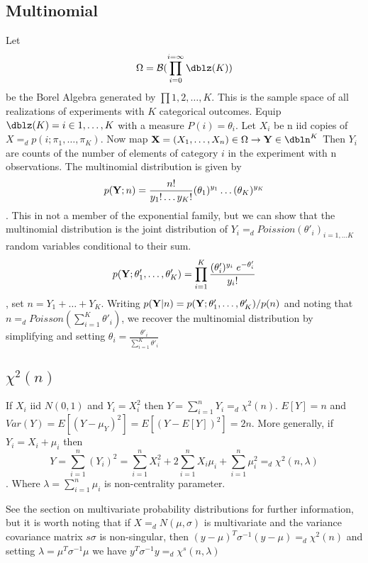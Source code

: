 \subsection{Multinomial}%
Let \[\Omega=\mathcal{B}(\prod\limits_{i=0}^{i=\infty}
\dblz(K))\] be the Borel Algebra generated by $\prod {1, 2,
\hdots , K}$. This is the sample space of all realizations of
experiments with $K$ categorical outcomes. Equip $\dblz(K)= {i
\in {1, \hdots, K}}$ with a measure $P(i)=\theta_i$. Let
${X_i}$ be n iid copies of $X =_d p(i ; \pi_1, \hdots ,
\pi_K)$.  Now map $\mbf{X}=(X_1, \hdots, X_n) \in \Omega
\rightarrow \mbf{Y} \in \dbln^K$  Then $Y_i$ are counts of the
number of elements of category $i$ in the experiment with n
observations.  The multinomial distribution is given by
\[p(\mathbf{Y};n)=\frac{n!}{y_1! \hdots y_K!} (\theta_1)^{y_1} \hdots
(\theta_K)^{y_K} \].  This in not a member of the exponential
family, but we can show that the multinomial distribution is
the joint distribution of ${Y_i =_d Poission(\theta'_i)}_{i=1,
\hdots K}$ random variables conditional to their sum.
\[p(\mathbf{Y}; \theta'_1, \hdots , \theta'_K) =
\prod\limits_{i=1}^{K} \frac{ (\theta'_i)^{y_i} \;
e^{-\theta'_i}}{y_i!}\], set $n=Y_1 + \hdots + Y_K$. Writing
$p(\mathbf{Y} | n) =p(\mathbf{Y}; \theta'_1, \hdots ,
\theta'_K) / p(n)$ and noting that $n=_d Poisson(\sum\limits_{i=1}^{K} \theta'_i)$, %
we recover the multinomial distribution by simplifying and
setting $\theta_i=\frac{\theta'_i}{\sum\limits_{i=1}^{K}
\theta'_i}$

\subsection{$\chi^2(n)$}
If ${X_i}$ iid $N(0,1)$ and $Y_i=X_i^2$ then
$Y=\sum\limits_{i=1}^{n} Y_i =_d \chi^2(n).$  $E[Y]=n$ and
$Var(Y)=E[(Y-\mu_Y)^2]=E[(Y-E[Y])^2]=2n$. More generally, if
$Y_i=X_i+\mu_i$ then \[Y=\sum\limits_{i=1}^{n} (Y_i)^2 =
\sum\limits_{i=1}^{n} X_i^2 + 2 \sum\limits_{i=1}^{n} X_i \mu_i
+ \sum\limits_{i=1}^{n} \mu_i^2 =_d \chi^2(n,\lambda)\].  Where
$\lambda=\sum\limits_{i=1}^{n} \mu_i$ is non-centrality
parameter.

See the section on multivariate probability distributions for
further information, but it is worth noting that if $X =_d
N(\mu,\sigma)$ is multivariate and the variance covariance
matrix $s\sigma$ is non-singular, then $(y-\mu)^T  \sigma^{-1}
(y-\mu) =_d \chi^2(n)$ and setting $\lambda= \mu^T \sigma^{-1}
\mu$ we have $ y^T \sigma^{-1} y =_d \chi^s(n,\lambda)$

